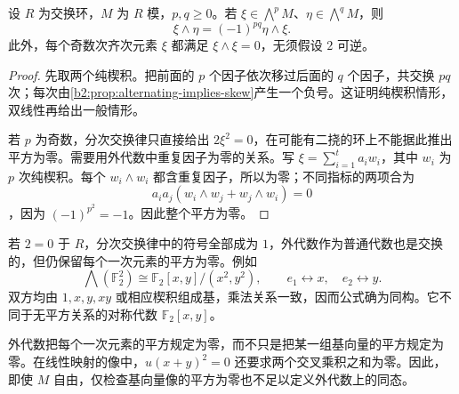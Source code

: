 \begin{proposition}[分次交换律]\label{b2:prop:exterior-graded-commutativity}
	设 \(R\) 为交换环，\(M\) 为 \(R\) 模，\(p,q\ge0\)。若 \(\xi\in\bigwedge^pM\)、\(\eta\in\bigwedge^qM\)，则
	\begin{equation}\label{b2:eq:graded-wedge-sign}
		\xi\wedge\eta=(-1)^{pq}\eta\wedge\xi.
	\end{equation}
	此外，每个奇数次齐次元素 \(\xi\) 都满足 \(\xi\wedge\xi=0\)，无须假设 \(2\) 可逆。
\end{proposition}
\begin{proof}
	先取两个纯楔积。把前面的 \(p\) 个因子依次移过后面的 \(q\) 个因子，共交换 \(pq\) 次；每次由\cref{b2:prop:alternating-implies-skew}产生一个负号。这证明纯楔积情形，双线性再给出一般情形。

	若 \(p\) 为奇数，分次交换律只直接给出 \(2\xi^2=0\)，在可能有二挠的环上不能据此推出平方为零。需要用外代数中重复因子为零的关系。写 \(\xi=\sum_{i=1}^t a_iw_i\)，其中 \(w_i\) 为 \(p\) 次纯楔积。每个 \(w_i\wedge w_i\) 都含重复因子，所以为零；不同指标的两项合为
	\[
		a_ia_j(w_i\wedge w_j+w_j\wedge w_i)=0
	\]
	，因为 \((-1)^{p^2}=-1\)。因此整个平方为零。
\end{proof}

若 \(2=0\) 于 \(R\)，分次交换律中的符号全部成为 \(1\)，外代数作为普通代数也是交换的，但仍保留每个一次元素的平方为零。例如
\[
	\bigwedge(\mathbb F_2^2) \cong\mathbb F_2[x,y]/(x^2,y^2), \qquad e_1\longleftrightarrow x,\quad e_2\longleftrightarrow y.
\]
双方均由 \(1,x,y,xy\) 或相应楔积组成基，乘法关系一致，因而公式确为同构。它不同于无平方关系的对称代数 \(\mathbb F_2[x,y]\)。

外代数把每个一次元素的平方规定为零，而不只是把某一组基向量的平方规定为零。在线性映射的像中，\(u(x+y)^2=0\) 还要求两个交叉乘积之和为零。因此，即使 \(M\) 自由，仅检查基向量像的平方为零也不足以定义外代数上的同态。

